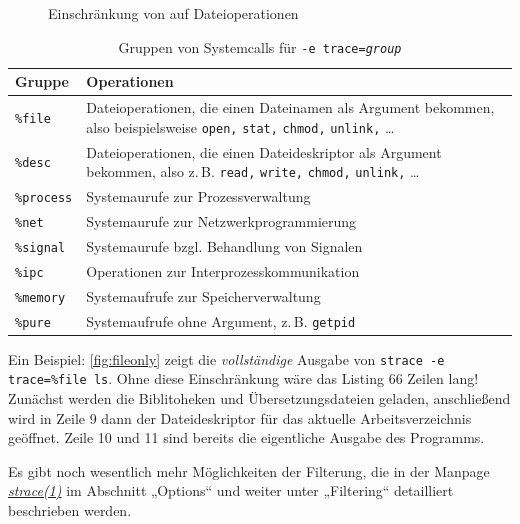\begin{figure}[tb]
  
  \caption{Einschränkung von \strace{} auf Dateioperationen}
  \label{fig:fileonly}
\end{figure}


\begin{table}[htb]
  \centering\small
  \begin{tabular}{|lp{6cm}|}
    \hline
    \textbf{Gruppe} & \textbf{Operationen} \\
    \hline
    \texttt{\%file}          & Dateioperationen, die einen Dateinamen als Argument
                               bekommen, also beispielsweise \texttt{open,} \texttt{stat,}
                               \texttt{chmod,} \texttt{unlink,} … \\
    \texttt{\%desc}          & Dateioperationen, die einen Dateideskriptor als Argument
                               bekommen, also z.\,B. \texttt{read,} \texttt{write,}
                               \texttt{chmod,} \texttt{unlink,} … \\
    \texttt{\%process}       & Systemaurufe zur Prozessverwaltung \\
    \texttt{\%net}           & Systemaurufe zur Netzwerkprogrammierung \\
    \texttt{\%signal}        & Systemaurufe bzgl. Behandlung von Signalen \\
    \texttt{\%ipc}           & Operationen zur Interprozesskommunikation \\
    \texttt{\%memory}        & Systemaufrufe zur Speicherverwaltung \\
    \texttt{\%pure}          & Systemaufrufe ohne Argument, z.\,B. \texttt{getpid} \\
    \hline
  \end{tabular}
  \caption{Gruppen von Systemcalls für \texttt{-e trace=\emph{group}}}
  \label{tab:strace_groups}
\end{table}

Ein Beispiel: \autoref{fig:fileonly} zeigt die \emph{vollständige} Ausgabe von \texttt{strace -e 
trace=\%file ls}. Ohne diese Einschränkung wäre das Listing 66 Zeilen lang! Zunächst werden
die Biblitoheken und Übersetzungsdateien geladen, anschließend wird in Zeile 9 dann der
Dateideskriptor für das aktuelle Arbeitsverzeichnis geöffnet. Zeile 10 und 11 sind bereits
die eigentliche Ausgabe des Programms.

Es gibt noch wesentlich mehr Möglichkeiten der Filterung, die in der Manpage
\href{http://man7.org/linux/man-pages/man1/strace.1.html#OPTIONS}{\emph{strace(1)}} im Abschnitt
„Options“ und weiter unter „Filtering“ detailliert beschrieben werden.


